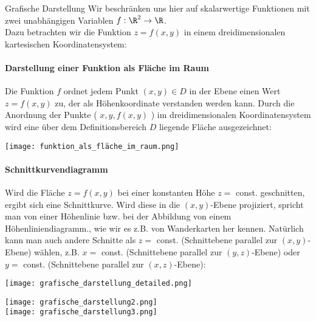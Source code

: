 \begin{concept}{Grafische Darstellung}
    Wir beschränken uns hier auf skalarwertige Funktionen mit zwei unabhängigen Variablen $f: \R^2 \to \R$.\\
    Dazu betrachten wir die Funktion $z = f(x, y)$ in einem dreidimensionalen kartesischen Koordinatensystem:
    
    \paragraph{Darstellung einer Funktion als Fläche im Raum}
    Die Funktion $f$ ordnet jedem Punkt $(x, y) \in D$ in der Ebene einen Wert $z=f(x, y)$ zu, der als Höhenkoordinate verstanden werden kann. 
    Durch die Anordnung der Punkte ( $x, y, f(x, y)$ ) im dreidimensionalen Koordinatensystem wird eine über dem Definitionsbereich $D$ liegende Fläche ausgezeichnet:

    \texttt{[image: funktion\_als\_fläche\_im\_raum.png]}
    
    \paragraph{Schnittkurvendiagramm}
    Wird die Fläche $z=f(x, y)$ bei einer konstanten Höhe $z=$ const. geschnitten, ergibt sich eine Schnittkurve. 
    Wird diese in die $(x, y)$-Ebene projiziert, spricht man von einer Höhenlinie bzw. bei der Abbildung von einem Höhenliniendiagramm., wie wir es z.B. von Wanderkarten her kennen. 
    Natürlich kann man auch andere Schnitte als $z=$ const. (Schnittebene parallel zur $(x, y)$-Ebene) wählen, z.B. $x=$ const. (Schnittebene parallel zur $(y, z)$-Ebene) oder $y=$ const. (Schnittebene parallel zur $(x, z)$-Ebene):

    \begin{minipage}{0.6\linewidth}
    \texttt{[image: grafische\_darstellung\_detailed.png]}
    \end{minipage}
    \begin{minipage}{0.38\linewidth}
    \texttt{[image: grafische\_darstellung2.png]}\\
    \texttt{[image: grafische\_darstellung3.png]}
    \end{minipage}
\end{concept}


